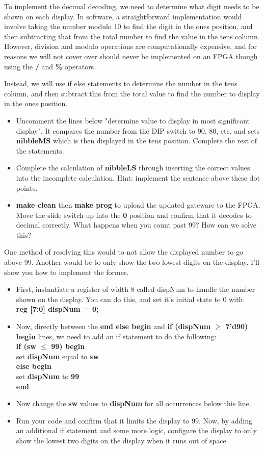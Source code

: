 \documentclass[12pt,a4paper]{article}
\begin{document}
	To implement the decimal decoding, we need to determine what digit needs to be shown on each display. In software, a straightforward implementation would involve taking the number modulo 10 to find the digit in the ones position, and then subtracting that from the total number to find the value in the tens column.  However, division and modulo operations are computationally expensive, and for reasons we will not cover over should never be implemented on an FPGA though using the \textbf{/} and \textbf{\%} operators.
	
	Instead, we will use if else statements to determine the number in the tens column, and then subtract this from the total value to find the number to display in the ones position.  
	
	\begin{itemize}
		\item Uncomment the lines below "determine value to display in most significant display". It compares the number from the DIP switch to 90, 80, etc, and sets \textbf{nibbleMS} which is then displayed in the tens position. Complete the rest of the statements. 
		\item Complete the calculation of \textbf{nibbleLS} through inserting the correct values into the incomplete calculation. Hint: implement the sentence above these dot points.
		\item \textbf{make clean} then \textbf{make prog} to upload the updated gateware to the FPGA. Move the slide switch up into the \textbf{0} position and confirm that it decodes to decimal correctly. What happens when you count past 99? How can we solve this?
	\end{itemize}
	One method of resolving this would to not allow the displayed number to go above 99. Another would be to only show the two lowest digits on the display. I'll show you how to implement the former.
	\begin{itemize}
		\item First, instantiate a register of width 8 called dispNum to handle the number shown on the display. You can do this, and set it's initial state to 0 with: \\ \textbf{reg [7:0] dispNum = 0;}
		\item Now, directly between the \textbf{end else begin} and \textbf{if (dispNum $\ge$ 7'd90) begin} lines, we need to add an if statement to do the following: \\ 
		\textbf{if (sw $\le$ 99) begin}\\
		set \textbf{dispNum} equal to \textbf{sw}\\
		\textbf{else begin}\\
		set \textbf{dispNum} to \textbf{99}\\
		\textbf{end}
		\item Now change the \textbf{sw} values to \textbf{dispNum} for all occurrences below this line.
		\item Run your code and confirm that it limits the display to 99. Now, by adding an additional if statement and some more logic, configure the display to only show the lowest two digits on the display when it runs out of space.
	\end{itemize}
\end{document}
